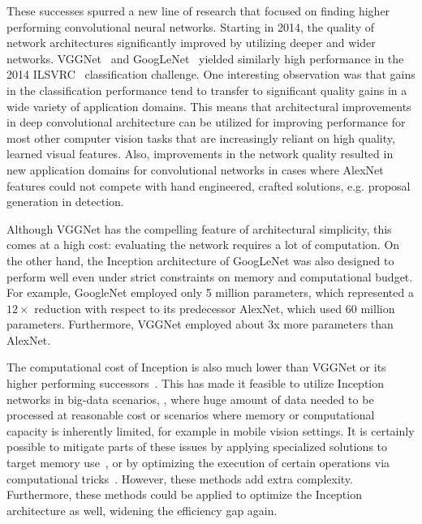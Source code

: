 \documentclass[10pt,twocolumn,letterpaper]{article}
\begin{document}
These successes spurred a new line of research that focused on finding
higher performing convolutional neural networks. Starting in 2014, the
quality of network architectures significantly improved
by utilizing deeper and wider networks. VGGNet~\cite{simonyan2014very} and
GoogLeNet~\cite{szegedy2015going}
yielded similarly high performance in the 2014 ILSVRC~\cite{russakovsky2014imagenet}
classification challenge. One interesting observation was that gains in the
classification performance tend to transfer to significant quality gains in a
wide variety of application domains. This means that architectural improvements
in deep convolutional architecture can be utilized for improving performance for
most other computer vision tasks that are increasingly reliant on high quality,
learned visual features.
Also, improvements in the network quality resulted in new application
domains for convolutional networks in cases where AlexNet features
could not compete with hand engineered, crafted solutions,
e.g. proposal generation in detection\cite{erhan2014scalable}.

Although VGGNet \cite{simonyan2014very} has the compelling feature
of architectural simplicity, this comes at a high cost: evaluating the
network requires a lot of computation. On the other hand, the Inception
architecture of GoogLeNet \cite{szegedy2015going} was also designed to
perform well even under strict constraints on memory and computational budget.
For example, GoogleNet employed only 5 million parameters,
which represented a $12\times$ reduction with respect to its predecessor
AlexNet, which used $60$ million parameters.
Furthermore, VGGNet employed about 3x more parameters than AlexNet.

The computational cost of Inception is also much lower than VGGNet or its
higher performing successors~\cite{he2015delving}. This has made it feasible to
utilize Inception networks in big-data scenarios\cite{schroff2015facenet},
\cite{movshovitz2015ontological}, where huge amount of data needed to be
processed at reasonable cost or scenarios where memory or
computational capacity is inherently limited, for example in mobile vision
settings.
It is certainly possible to mitigate parts of these issues by applying
specialized solutions to target memory use~\cite{chen2015compressing},
\cite{psichogios1993svd}
or by optimizing the execution of certain operations via computational
tricks~\cite{lavin2015fast}. However, these methods add extra complexity.
Furthermore, these methods could be applied to optimize the
Inception architecture
as well, widening the efficiency gap again.
\end{document}
